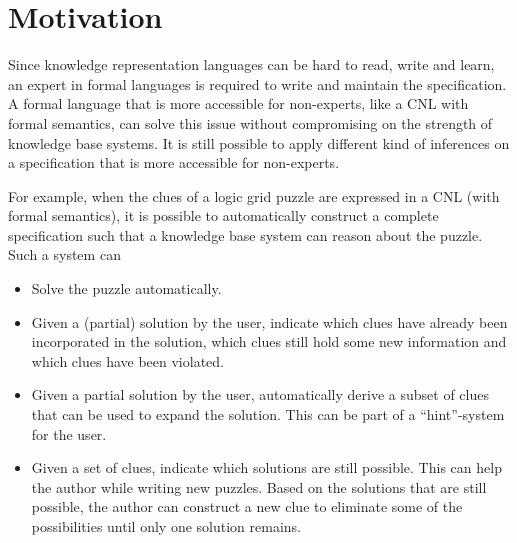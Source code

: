 \section{Motivation}
Since knowledge representation languages can be hard to read, write and learn, an expert in formal languages is required to write and maintain the specification. A formal language that is more accessible for non-experts, like a CNL with formal semantics, can solve this issue without compromising on the strength of knowledge base systems. It is still possible to apply different kind of inferences on a specification that is more accessible for non-experts.

For example, when the clues of a logic grid puzzle are expressed in a CNL (with formal semantics), it is possible to automatically construct a complete specification such that a knowledge base system can reason about the puzzle. Such a system can
\begin{itemize}
  \item Solve the puzzle automatically.
  \item Given a (partial) solution by the user, indicate which clues have already been incorporated in the solution, which clues still hold some new information and which clues have been violated.
  \item Given a partial solution by the user, automatically derive a subset of clues that can be used to expand the solution. This can be part of a ``hint''-system for the user.
  \item Given a set of clues, indicate which solutions are still possible. This can help the author while writing new puzzles. Based on the solutions that are still possible, the author can construct a new clue to eliminate some of the possibilities until only one solution remains.
\end{itemize}

